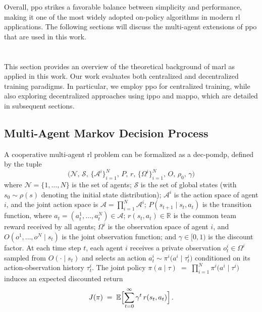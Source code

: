 Overall, \gls{ppo} strikes a favorable balance between simplicity and performance, making it one of the most widely adopted on-policy algorithms in modern \gls{rl} applications. The following sections will discuss the multi-agent extensions of \gls{ppo} that are used in this work.
\section{}
This section provides an overview of the theoretical background of \gls{marl} as applied in this work. Our work evaluates both centralized and decentralized training paradigms. In particular, we employ \gls{ppo} for centralized training, while also exploring decentralized approaches using \gls{ippo} and \gls{mappo}, which are detailed in subsequent sections.
\subsection{Multi-Agent Markov Decision Process}
A cooperative multi-agent \gls{rl} problem can be formalized as a \gls{dec-pomdp}\cite{oliehoek_concise_2016}, defined by the tuple
\begin{equation}
  \bigl(\mathcal{N},\,\mathcal{S},\,\{\mathcal{A}^i\}_{i=1}^N,\,P,\,r,\,\{\Omega^i\}_{i=1}^N,\,O,\,\rho_0,\,\gamma\bigr)
\end{equation}
where $\mathcal{N}=\{1,\dots,N\}$ is the set of agents; $\mathcal{S}$ is the set of global states (with $s_0\sim\rho(s)$ denoting the initial state distribution); $\mathcal{A}^i$ is the action space of agent $i$, and the joint action space is $\mathcal{A} = \prod_{i=1}^N \mathcal{A}^i$; $P(s_{t+1} \mid s_t, a_t)$ is the transition function, where $a_t=(a^1_t,\dots,a^N_t)\in\mathcal{A}$; $r(s_t,a_t)\in\mathbb{R}$ is the common team reward received by all agents; $\Omega^i$ is the observation space of agent $i$, and $O(o^1,\dots,o^N\mid s_t)$ is the joint observation function; and $\gamma\in[0,1)$ is the discount factor.
At each time step $t$, each agent $i$ receives a private observation $o^i_t \in \Omega^i$ sampled from $O(\cdot\mid s_t)$ and selects an action 
$a^i_t \sim \pi^i\bigl(a^i \mid \tau^i_t\bigr)$
conditioned on its action-observation history $\tau^i_t$. The joint policy 
$\pi(a\mid \tau) \;=\; \prod_{i=1}^N \pi^i\bigl(a^i\mid \tau^i\bigr)$
induces an expected discounted return
\begin{equation}
  J(\pi) \;=\; \mathbb{E}\Bigl[\sum_{t=0}^\infty \gamma^t\,r(s_t, a_t)\Bigr]\,. 
\end{equation}

